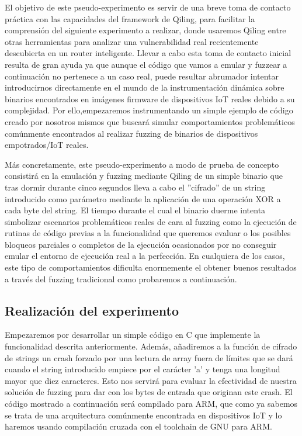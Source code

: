El objetivo de este pseudo-experimento es servir de una breve toma de contacto práctica con las capacidades del framework de Qiling, para facilitar la comprensión 
del siguiente experimento a realizar, donde usaremos Qiling entre otras herramientas para analizar una vulnerabilidad real recientemente descubierta en un router
inteligente. Llevar a cabo esta toma de contacto inicial resulta de gran ayuda ya que aunque el código que vamos a emular y fuzzear a continuación 
no pertenece a un caso real, puede resultar abrumador intentar introducirnos directamente en el mundo de la instrumentación dinámica sobre binarios encontrados en 
imágenes firmware de dispositivos IoT reales debido a su complejidad. Por ello,empezaremos instrumentando un simple ejemplo de código creado por nosotros mismos que 
buscará simular comportamientos problemáticos comúnmente encontrados al realizar fuzzing de binarios de dispositivos empotrados/IoT reales.\bigskip

Más concretamente, este pseudo-experimento a modo de prueba de concepto consistirá en la emulación y fuzzing mediante Qiling de un simple binario que tras 
dormir durante cinco segundos lleva a cabo el ''cifrado'' de un string introducido como parámetro mediante la aplicación de una operación
XOR a cada byte del string. El tiempo durante el cual el binario duerme intenta simbolizar escenarios problemáticos reales de cara al fuzzing 
como la ejecución de rutinas de código previas a la funcionalidad que queremos evaluar o los posibles bloqueos parciales o completos de la ejecución ocasionados por no conseguir emular el entorno de ejecución real a la perfección. En cualquiera de los casos, este tipo de comportamientos dificulta
enormemente el obtener buenos resultados a través del fuzzing tradicional como probaremos a continuación.

\subsection{Realización del experimento}
Empezaremos por desarrollar un simple código en C que implemente la funcionalidad descrita anteriormente. Además, añadiremos a la función de 
cifrado de strings un crash forzado por una lectura de array fuera de límites que se dará cuando el string introducido empiece por el carácter
'a' y tenga una longitud mayor que diez caracteres. Esto nos servirá para evaluar la efectividad de nuestra solución de fuzzing para dar con 
los bytes de entrada que originan este crash. El código mostrado a continuación será compilado para ARM, que como ya sabemos se trata de una arquitectura 
comúnmente encontrada en dispositivos IoT y lo haremos usando compilación cruzada con el toolchain de GNU para ARM.

